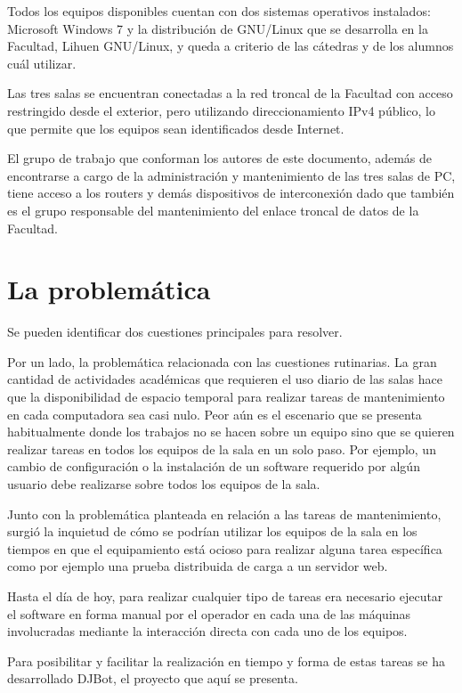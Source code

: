 \documentclass[runningheads,a4paper,titlepage]{llncs}
\begin{document}
Todos los equipos disponibles cuentan con dos sistemas operativos instalados:
Microsoft Windows 7 y la distribución de GNU/Linux que se desarrolla en la Facultad,
Lihuen GNU/Linux\cite{lihuen}, y queda a criterio de las cátedras y de los
alumnos cuál utilizar.

Las tres salas se encuentran conectadas a la red troncal de la Facultad con
acceso restringido desde el exterior, pero utilizando direccionamiento IPv4
público, lo que permite que los equipos sean identificados desde Internet.

El grupo de trabajo que conforman los autores de este documento, además de
encontrarse a cargo de la administración y mantenimiento de las tres salas de PC, 
tiene acceso a los routers y demás dispositivos de interconexión dado que
también es el grupo responsable del mantenimiento del enlace troncal de datos de
la Facultad.


\section{La problemática}

\noindent Se pueden identificar dos cuestiones principales para resolver.

Por un lado, la problemática relacionada con las cuestiones rutinarias. La gran
cantidad de actividades académicas que requieren el uso diario de las salas hace
que la disponibilidad de espacio temporal para realizar tareas de mantenimiento en
cada computadora sea casi nulo. Peor a\'un es el escenario que se presenta
habitualmente donde los trabajos no se hacen sobre un equipo sino que se quieren
realizar tareas en todos los equipos de la sala en un solo paso. 
Por ejemplo, un cambio de configuración o la instalación de
un software requerido por alg\'un usuario debe realizarse sobre todos los
equipos de la sala.

Junto con la  problemática planteada en relación a las tareas de mantenimiento,
surgió la inquietud de cómo se podrían utilizar los equipos de la sala en los
tiempos en que el equipamiento está ocioso para realizar alguna tarea específica
como por ejemplo una prueba distribuida de carga a un servidor web.  

Hasta el día de hoy, para realizar cualquier tipo de tareas era necesario
ejecutar el software en forma manual por el operador en cada una de las máquinas
involucradas mediante la interacción directa con cada uno de los equipos.

Para posibilitar y facilitar la realización en tiempo y forma de estas tareas se ha
desarrollado DJBot, el proyecto que aqu\'i se presenta.
\end{document}

